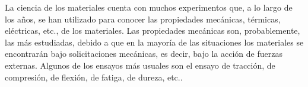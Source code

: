 



La ciencia de los materiales cuenta con muchos experimentos que, a lo largo de los años, se han utilizado para conocer las propiedades mecánicas, térmicas, eléctricas, etc., de los materiales. Las propiedades mecánicas son, probablemente, las más estudiadas, debido a que en la mayoría de las situaciones los materiales se encontrarán bajo solicitaciones mecánicas, es decir, bajo la acción de fuerzas externas. Algunos de los ensayos más usuales son el ensayo de tracción, de compresión, de flexión, de fatiga, de dureza, etc..  

